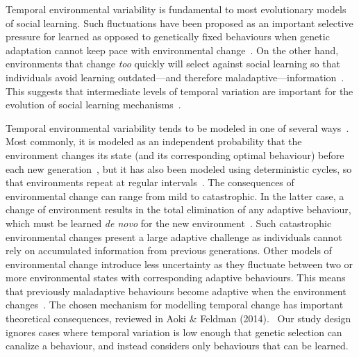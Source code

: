 \documentclass[letterpaper,11.5pt]{scrartcl}
\begin{document}
Temporal environmental variability is fundamental to most evolutionary models of
social learning. Such fluctuations have been proposed as an important selective
pressure for learned as opposed to genetically fixed behaviours when genetic adaptation cannot keep pace with environmental change~\citep{Richerson2000}. On the other hand, environments that change \emph{too} quickly will select against social learning so that individuals avoid learning outdated---and therefore maladaptive---information~\citep{Feldman1996,
BoydRicherson1985}. This suggests that intermediate levels of temporal variation
are important for the evolution of social learning mechanisms~\citep{aoki2005}.

Temporal environmental variability tends to be modeled in one of 
several ways~\citep{aoki2014evolution}. Most commonly, it is modeled
as an independent probability that the environment changes its state (and its corresponding optimal behaviour) before each new generation~\citep{BoydRicherson1985,Rogers1988,Feldman1996,McElreath2005,Enquist2007,perreault2012bayesian,aoki2014evolution}, but
it has also been modeled using deterministic cycles, so that environments repeat at regular intervals~\citep{Feldman1996, aoki2014evolution}.
The consequences of environmental change can range from mild to catastrophic. In the latter case, a change of environment results in the total elimination of any adaptive behaviour, which must be learned \emph{de novo} for the new environment~\citep{Rogers1988}. Such catastrophic environmental changes present
a large adaptive challenge as individuals cannot rely on accumulated information
from previous generations. Other models of environmental change introduce less
uncertainty as they fluctuate between two or more environmental states with corresponding adaptive behaviours. This means that previously maladaptive
behaviours become adaptive when the environment changes~\citep{perreault2012bayesian}. The chosen mechanism for modelling temporal change has important theoretical consequences, reviewed in Aoki \& Feldman (2014).~\nocite{aoki2014evolution} Our study design ignores cases where temporal variation is low enough that genetic selection can canalize a behaviour, and instead considers only behaviours that can be learned.
\end{document}
